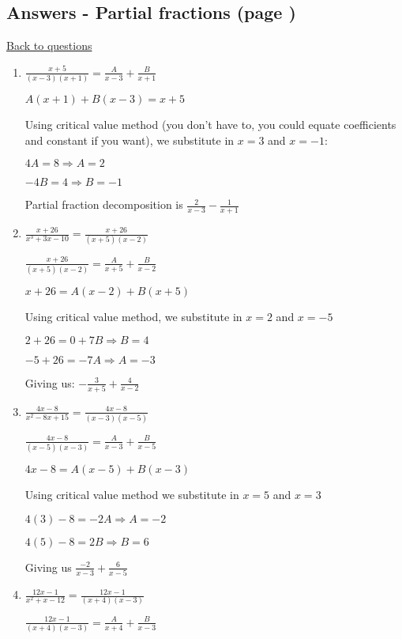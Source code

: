 \documentclass[../main.tex]{subfiles}
\begin{document}
\hypertarget{partialfractionsanswers}{\subsection*{Answers - Partial fractions (page \pageref{partial fractions})}}
\hyperlink{partialfractionsquestions}{Back to questions}
\label{Partial fractions answers}
\begin{enumerate}[itemsep=0.7cm]
    \item 
    $\frac{x+5}{(x-3)(x+1)}=\frac{A}{x-3}+\frac{B}{x+1}$

    $A(x+1)+B(x-3)=x+5$

    Using critical value method (you don't have to, you could equate coefficients and constant if you want), we substitute in $x=3$ and $x=-1$:

    $4A=8 \Rightarrow A=2$

    $-4B=4 \Rightarrow B=-1$

    Partial fraction decomposition is $\frac{2}{x-3}-\frac{1}{x+1}$

    \item 
    $\frac{x+26}{x^3+3x-10}=\frac{x+26}{(x+5)(x-2)}$

    $\frac{x+26}{(x+5)(x-2)}=\frac{A}{x+5}+\frac{B}{x-2}$

    $x+26=A(x-2)+B(x+5)$

    Using critical value method, we substitute in $x=2$ and $x=-5$

    $2+26=0+7B \Rightarrow B=4$

    $-5+26=-7A \Rightarrow A=-3$

    Giving us: $-\frac{3}{x+5}+\frac{4}{x-2}$

    \item 
    $\frac{4x-8}{x^2-8x+15}=\frac{4x-8}{(x-3)(x-5)}$

    $\frac{4x-8}{(x-5)(x-3)}=\frac{A}{x-3}+\frac{B}{x-5}$

    $4x-8=A(x-5)+B(x-3)$

    Using critical value method we substitute in $x=5$ and $x=3$

    $4(3)-8=-2A \Rightarrow A=-2$

    $4(5)-8=2B \Rightarrow B=6$

    Giving us $\frac{-2}{x-3}+\frac{6}{x-5}$

    \item 
    $\frac{12x-1}{x^2+x-12}=\frac{12x-1}{(x+4)(x-3)}$

    $\frac{12x-1}{(x+4)(x-3)}=\frac{A}{x+4}+\frac{B}{x-3}$


\end{enumerate}
\end{document}
